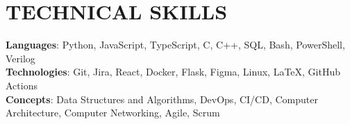 \section{\textbf {\large TECHNICAL SKILLS}}
    \begin{itemize}[leftmargin=0.15in, label={}]
	\small{\item{
		\textbf{Languages}{: Python, JavaScript, TypeScript, C, C++, SQL, Bash, PowerShell, Verilog} \\
		\textbf{Technologies}{: Git, Jira, React, Docker, Flask, Figma, Linux, LaTeX, GitHub Actions} \\
		\textbf{Concepts}{: Data Structures and Algorithms, DevOps, CI/CD, Computer Architecture, Computer Networking, Agile, Scrum}
	}}
    \end{itemize}